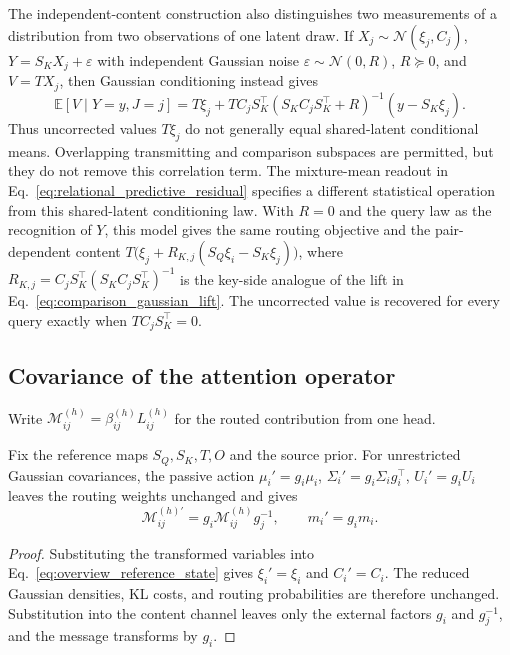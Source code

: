 \documentclass[twoside,11pt]{article}
\begin{document}
The independent-content construction also distinguishes two measurements of a distribution from two observations of one latent draw. If $X_j\sim\mathcal N(\xi_j,C_j)$, $Y=S_KX_j+\varepsilon$ with independent Gaussian noise $\varepsilon\sim\mathcal N(0,R)$, $R\succeq0$, and $V=T X_j$, then Gaussian conditioning instead gives \citep{petersen2012matrix}
\begin{equation}
\mathbb E[V\mid Y=y,J=j]
=T\xi_j+TC_jS_K^\top(S_KC_jS_K^\top+R)^{-1}(y-S_K\xi_j).
\label{eq:relational_shared_latent_correction}
\end{equation}
Thus uncorrected values $T\xi_j$ do not generally equal shared-latent conditional means. Overlapping transmitting and comparison subspaces are permitted, but they do not remove this correlation term. The mixture-mean readout in Eq.~\eqref{eq:relational_predictive_residual} specifies a different statistical operation from this shared-latent conditioning law. With $R=0$ and the query law as the recognition of $Y$, this model gives the same routing objective and the pair-dependent content $T\bigl(\xi_j+R_{K,j}(S_Q\xi_i-S_K\xi_j)\bigr)$, where $R_{K,j}=C_jS_K^\top(S_KC_jS_K^\top)^{-1}$ is the key-side analogue of the lift in Eq.~\eqref{eq:comparison_gaussian_lift}. The uncorrected value is recovered for every query exactly when $TC_jS_K^\top=0$.

\subsection{Covariance of the attention operator}
\label{sec:passive_covariance}
Write $\mathcal M_{ij}^{(h)}=\beta_{ij}^{(h)}L_{ij}^{(h)}$ for the routed contribution from one head.

\begin{proposition}
\label{prop:passive_covariance}
Fix the reference maps $S_Q,S_K,T,O$ and the source prior. For unrestricted Gaussian covariances, the passive action $\mu_i'=g_i\mu_i$, $\Sigma_i'=g_i\Sigma_i g_i^\top$, $U_i'=g_iU_i$ leaves the routing weights unchanged and gives
\begin{equation}
\mathcal M_{ij}^{(h)\prime}=g_i\mathcal M_{ij}^{(h)}g_j^{-1},
\qquad m_i'=g_i m_i.
\label{eq:relational_covariance}
\end{equation}
\end{proposition}
\begin{proof}
Substituting the transformed variables into Eq.~\eqref{eq:overview_reference_state} gives $\xi_i'=\xi_i$ and $C_i'=C_i$. The reduced Gaussian densities, KL costs, and routing probabilities are therefore unchanged. Substitution into the content channel leaves only the external factors $g_i$ and $g_j^{-1}$, and the message transforms by $g_i$.
\end{proof}
\end{document}
